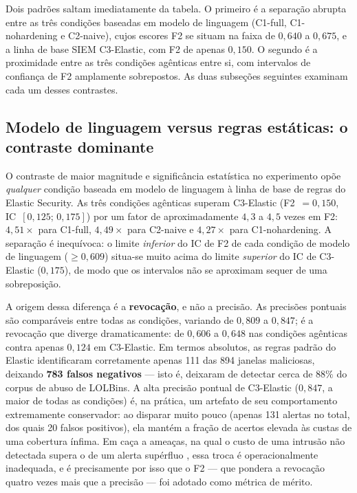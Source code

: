 Dois padrões saltam imediatamente da tabela. O primeiro é a separação abrupta
entre as três condições baseadas em modelo de linguagem (C1-full, C1-nohardening
e C2-naive), cujos escores F2 se situam na faixa de $0{,}640$ a $0{,}675$, e a
linha de base SIEM C3-Elastic, com F2 de apenas $0{,}150$. O segundo é a
proximidade entre as três condições agênticas entre si, com intervalos de
confiança de F2 amplamente sobrepostos. As duas subseções seguintes examinam
cada um desses contrastes.

\subsection{Modelo de linguagem versus regras estáticas: o contraste dominante}
\label{subsec:res-llm-vs-siem}

O contraste de maior magnitude e significância estatística no experimento opõe
\emph{qualquer} condição baseada em modelo de linguagem à linha de base de
regras do Elastic Security. As três condições agênticas superam C3-Elastic
(F2~$=0{,}150$, IC~$[0{,}125;\,0{,}175]$) por um fator de aproximadamente
$4{,}3$ a $4{,}5$ vezes em F2: $4{,}51\times$ para C1-full, $4{,}49\times$ para
C2-naive e $4{,}27\times$ para C1-nohardening. A separação é inequívoca: o limite
\emph{inferior} do IC de F2 de cada condição de modelo de linguagem
($\geq 0{,}609$) situa-se muito acima do limite \emph{superior} do IC de
C3-Elastic ($0{,}175$), de modo que os intervalos não se aproximam sequer de uma
sobreposição.

A origem dessa diferença é a \textbf{revocação}, e não a precisão. As precisões
pontuais são comparáveis entre todas as condições, variando de $0{,}809$ a
$0{,}847$; é a revocação que diverge dramaticamente: de $0{,}606$ a $0{,}648$
nas condições agênticas contra apenas $0{,}124$ em C3-Elastic. Em termos
absolutos, as regras padrão do Elastic identificaram corretamente apenas 111 das
894 janelas maliciosas, deixando \textbf{783 falsos negativos} --- isto é,
deixaram de detectar cerca de $88\%$ do corpus de abuso de LOLBins. A alta
precisão pontual de C3-Elastic ($0{,}847$, a maior de todas as condições) é, na
prática, um artefato de seu comportamento extremamente conservador: ao disparar
muito pouco (apenas 131 alertas no total, dos quais 20 falsos positivos), ela
mantém a fração de acertos elevada às custas de uma cobertura ínfima. Em caça a
ameaças, na qual o custo de uma intrusão não detectada supera o de um alerta
supérfluo \cite{dolan-gavitt2025}, essa troca é operacionalmente inadequada, e é
precisamente por isso que o F2 --- que pondera a revocação quatro vezes mais que
a precisão --- foi adotado como métrica de mérito.

